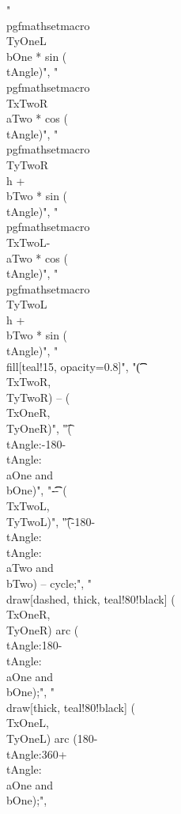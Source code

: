 "\t\\pgfmathsetmacro{\\TyOneL}{\\bOne * sin (\\tAngle)}",
"\t\\pgfmathsetmacro{\\TxTwoR}{\\aTwo * cos (\\tAngle)}",
"\t\\pgfmathsetmacro{\\TyTwoR}{\\h + \\bTwo * sin (\\tAngle)}",
"\t\\pgfmathsetmacro{\\TxTwoL}{-\\aTwo * cos (\\tAngle)}",
"\t\\pgfmathsetmacro{\\TyTwoL}{\\h + \\bTwo * sin (\\tAngle)}",
"\t\\fill[teal!15, opacity=0.8]",
"\t\t(\\TxTwoR, \\TyTwoR) -- (\\TxOneR, \\TyOneR)",
"\t\tarc (\\tAngle:{-180-\\tAngle}:{\\aOne} and {\\bOne})",
"\t\t-- (\\TxTwoL, \\TyTwoL)",
"\t\tarc ({-180-\\tAngle}:\\tAngle:{\\aTwo} and {\\bTwo}) -- cycle;",
"\t\\draw[dashed, thick, teal!80!black] (\\TxOneR, \\TyOneR) arc (\\tAngle:{180-\\tAngle}:{\\aOne} and {\\bOne});",
"\t\\draw[thick, teal!80!black] (\\TxOneL, \\TyOneL) arc ({180-\\tAngle}:{360+\\tAngle}:{\\aOne} and {\\bOne});",
